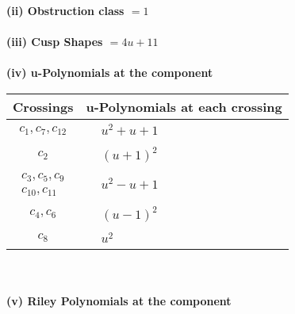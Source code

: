 \documentclass[1p]{elsarticle_modified}
\theoremstyle{definition}
\begin{document}
\flushleft \textbf{(ii) Obstruction class $= 1$}\\~\\
\flushleft \textbf{(iii) Cusp Shapes $= 4 u+11$}\\~\\
\newpage\renewcommand{\arraystretch}{1}
\flushleft \textbf{(iv) u-Polynomials at the component}\newline \\
\begin{tabular}{m{50pt}|m{274pt}}
Crossings & \hspace{64pt}u-Polynomials at each crossing \\
\hline $$\begin{aligned}c_{1},c_{7},c_{12}\end{aligned}$$&$\begin{aligned}
&u^2+u+1
\end{aligned}$\\
\hline $$\begin{aligned}c_{2}\end{aligned}$$&$\begin{aligned}
&(u+1)^2
\end{aligned}$\\
\hline $$\begin{aligned}c_{3},c_{5},c_{9}\\c_{10},c_{11}\end{aligned}$$&$\begin{aligned}
&u^2- u+1
\end{aligned}$\\
\hline $$\begin{aligned}c_{4},c_{6}\end{aligned}$$&$\begin{aligned}
&(u-1)^2
\end{aligned}$\\
\hline $$\begin{aligned}c_{8}\end{aligned}$$&$\begin{aligned}
&u^2
\end{aligned}$\\
\hline
\end{tabular}\\~\\
\newpage\renewcommand{\arraystretch}{1}
\flushleft \textbf{(v) Riley Polynomials at the component}\newline \\
\end{document}
